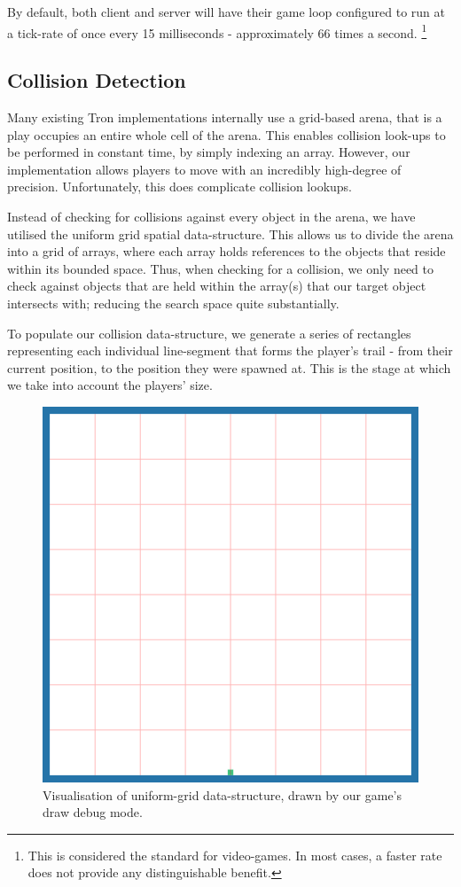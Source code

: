 \documentclass{standalone}
\begin{document}
		By default, both client and server will have their game loop configured to run at a tick-rate of once every 15 milliseconds - approximately 66 times a second. \footnote{This is considered the standard for video-games. In most cases, a faster rate does not provide any distinguishable benefit.}

		\subsection{Collision Detection} \label{collisionDetection}
			Many existing Tron implementations internally use a grid-based arena, that is a play occupies an entire whole cell of the arena. This enables collision look-ups to be performed in constant time, by simply indexing an array. However, our implementation allows players to move with an incredibly high-degree of precision\parencite{JsNumbers}. Unfortunately, this does complicate collision lookups.

			Instead of checking for collisions against every object in the arena, we have utilised the uniform grid spatial data-structure. This allows us to divide the arena into a grid of arrays, where each array holds references to the objects that reside within its bounded space. Thus, when checking for a collision, we only need to check against objects that are held within the array(s) that our target object intersects with; reducing the search space quite substantially.

			To populate our collision data-structure, we generate a series of rectangles representing each individual line-segment that forms the player's trail - from their current position, to the position they were spawned at. This is the stage at which we take into account the players' size.

			\begin{figure}[!htbp]
				\centering
				\includegraphics[width=.8\textwidth]{resources/images/uniformgrid.png}
				\caption{Visualisation of uniform-grid data-structure, drawn by our game's draw debug mode.}
			\end{figure}
			\FloatBarrier
\end{document}
